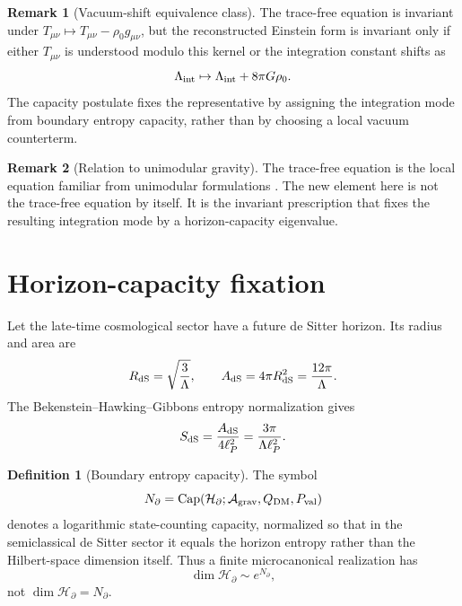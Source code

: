 \documentclass[aps,prd,reprint,nofootinbib,superscriptaddress,floatfix]{revtex4-2}
\numberwithin{equation}{section}
\theoremstyle{definition}
\newtheorem{definition}{Definition}[section]
\newtheorem{remark}{Remark}[section]
\theoremstyle{plain}
\newcommand{\Agrav}{\mathcal A_{\rm grav}}
\newcommand{\Ncap}{N_{\partial}}
\newcommand{\Capacity}{\operatorname{Cap}}
\begin{document}
\begin{remark}[Vacuum-shift equivalence class]
The trace-free equation is invariant under \(T_{\mu\nu}\mapsto T_{\mu\nu}-\rho_0g_{\mu\nu}\), but the reconstructed Einstein form is invariant only if either \(T_{\mu\nu}\) is understood modulo this kernel or the integration constant shifts as
\[
\Lambda_{\rm int}\mapsto\Lambda_{\rm int}+8\pi G\rho_0 .
\]
The capacity postulate fixes the representative by assigning the integration mode from boundary entropy capacity, rather than by choosing a local vacuum counterterm.
\end{remark}

\begin{remark}[Relation to unimodular gravity]
The trace-free equation is the local equation familiar from unimodular formulations \cite{AndersonFinkelstein1971,Unruh1989,HenneauxTeitelboim1989,Weinberg1989}.  The new element here is not the trace-free equation by itself.  It is the invariant prescription that fixes the resulting integration mode by a horizon-capacity eigenvalue.
\end{remark}

\section{Horizon-capacity fixation}

Let the late-time cosmological sector have a future de Sitter horizon.  Its radius and area are
\begin{equation}
R_{\rm dS}=\sqrt{\frac3{\Lambda}},
\qquad
A_{\rm dS}=4\pi R_{\rm dS}^2=\frac{12\pi}{\Lambda}.
\end{equation}
The Bekenstein--Hawking--Gibbons entropy normalization gives \cite{Bekenstein1973,Hawking1975,GibbonsHawking1977}
\begin{equation}
S_{\rm dS}=\frac{A_{\rm dS}}{4\ell_P^2}
=
\frac{3\pi}{\Lambda\ell_P^2}.
\end{equation}

\begin{definition}[Boundary entropy capacity]\label{def:entropy-capacity}
The symbol
\[
\Ncap=\Capacity(\mathcal H_\partial;\Agrav,Q_{\rm DM},P_{\rm val})
\]
denotes a logarithmic state-counting capacity, normalized so that in the semiclassical de Sitter sector it equals the horizon entropy rather than the Hilbert-space dimension itself.  Thus a finite microcanonical realization has
\[
\dim\mathcal H_\partial\sim e^{\Ncap},
\]
not \(\dim\mathcal H_\partial=\Ncap\).
\end{definition}
\end{document}
